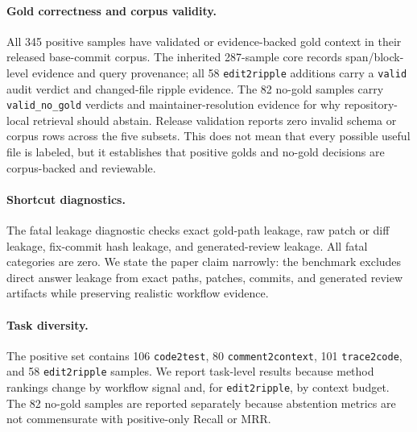 \documentclass[11pt]{article}
\newcommand{\code}[1]{\texttt{#1}}
\begin{document}
\paragraph{Gold correctness and corpus validity.}
All 345 positive samples have validated or evidence-backed gold context in their released base-commit corpus. The inherited 287-sample core records span/block-level evidence and query provenance; all 58 \code{edit2ripple} additions carry a \code{valid} audit verdict and changed-file ripple evidence. The 82 no-gold samples carry \code{valid\_no\_gold} verdicts and maintainer-resolution evidence for why repository-local retrieval should abstain. Release validation reports zero invalid schema or corpus rows across the five subsets. This does not mean that every possible useful file is labeled, but it establishes that positive golds and no-gold decisions are corpus-backed and reviewable.

\paragraph{Shortcut diagnostics.}
The fatal leakage diagnostic checks exact gold-path leakage, raw patch or diff leakage, fix-commit hash leakage, and generated-review leakage. All fatal categories are zero. We state the paper claim narrowly: the benchmark excludes direct answer leakage from exact paths, patches, commits, and generated review artifacts while preserving realistic workflow evidence.

\paragraph{Task diversity.}
The positive set contains 106 \code{code2test}, 80 \code{comment2context}, 101 \code{trace2code}, and 58 \code{edit2ripple} samples. We report task-level results because method rankings change by workflow signal and, for \code{edit2ripple}, by context budget. The 82 no-gold samples are reported separately because abstention metrics are not commensurate with positive-only Recall or MRR.
\end{document}

